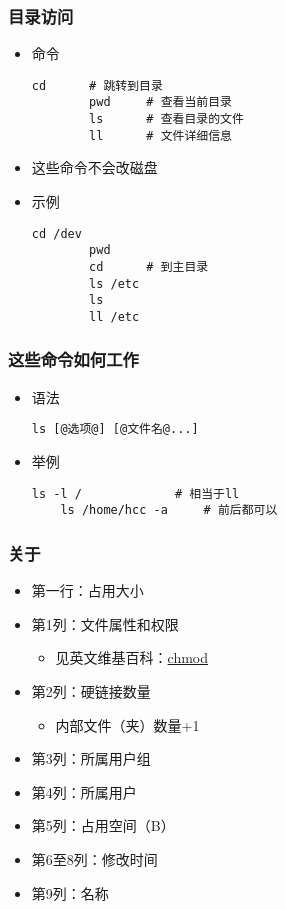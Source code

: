 \begin{frame} [fragile]
	\frametitle{目录访问}
	\linespread{1}
	\begin{itemize}
	\item 命令
		\begin{lstlisting}[style=bashstyle, gobble=8, texcl]
		cd		# 跳转到目录
		pwd		# 查看当前目录
		ls		# 查看目录的文件
		ll		# 文件详细信息
		\end{lstlisting}
	\item 这些命令不会改磁盘
	\item 示例
		\begin{lstlisting}[style=bashstyle, gobble=8, texcl]
		cd /dev
		pwd
		cd		# 到主目录
		ls /etc
		ls
		ll /etc
	\end{lstlisting}
	\end{itemize}
\end{frame}

\begin{frame} [fragile]
	\frametitle{这些命令如何工作}
	\linespread{1.25}
	\begin{itemize}
	\item 语法
	\begin{lstlisting}[style=bashstyle, gobble=4, escapechar=@]
	ls [@选项@] [@文件名@...]
	\end{lstlisting}
	\item 举例
	\begin{lstlisting}[style=bashstyle, gobble=4, texcl]
	ls -l /				# 相当于ll
	ls /home/hcc -a		# 前后都可以
	\end{lstlisting}
	\end{itemize}
\end{frame}

\begin{frame} [fragile]
	\frametitle{关于}
	\linespread{1.25}
	\begin{itemize}
	\item 第一行：占用大小
	\item 第1列：文件属性和权限
		\begin{itemize}
		\item 见英文维基百科：\href{https://en.wikipedia.org/wiki/Chmod}{chmod}
		\end{itemize}
	\item 第2列：硬链接数量
		\begin{itemize}
		\item 内部文件（夹）数量+1
		\end{itemize}
	\item 第3列：所属用户组
	\item 第4列：所属用户
	\item 第5列：占用空间（B）
	\item 第6至8列：修改时间
	\item 第9列：名称
	\end{itemize}
\end{frame}

